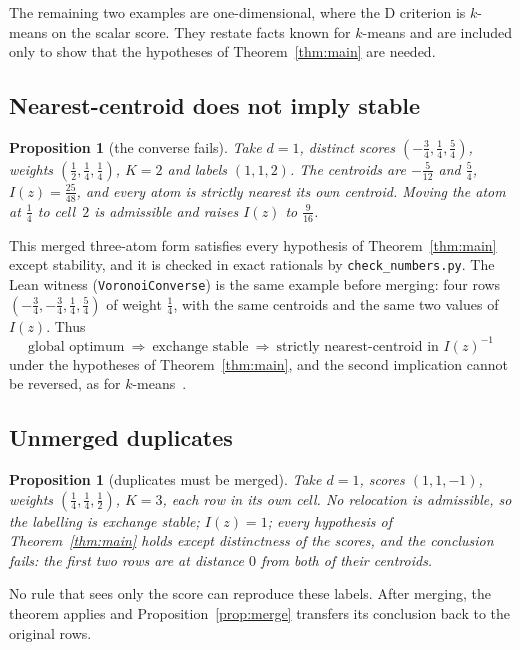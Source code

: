 \documentclass[11pt]{amsart}
\newtheorem{proposition}[theorem]{Proposition}
\theoremstyle{definition}
\theoremstyle{remark}
\newcommand{\Ib}{I(z)}
\begin{document}
The remaining two examples are one-dimensional, where the D criterion is $k$-means on the
scalar score. They restate facts known for $k$-means and are included only to show that the
hypotheses of Theorem~\ref{thm:main} are needed.

\subsection*{Nearest-centroid does not imply stable}

\begin{proposition}[the converse fails]\label{prop:converse}
Take $d=1$, distinct scores $(-\tfrac34,\tfrac14,\tfrac54)$, weights
$(\tfrac12,\tfrac14,\tfrac14)$, $K=2$ and labels $(1,1,2)$. The centroids are $-\tfrac5{12}$ and
$\tfrac54$, $\Ib=\tfrac{25}{48}$, and every atom is strictly nearest its own centroid. Moving the
atom at $\tfrac14$ to cell~$2$ is admissible and raises $\Ib$ to $\tfrac9{16}$.
\end{proposition}

This merged three-atom form satisfies every hypothesis of Theorem~\ref{thm:main} except
stability, and it is checked in exact rationals by \texttt{check\_numbers.py}. The Lean witness
(\texttt{VoronoiConverse}) is the same example before merging: four rows
$(-\tfrac34,-\tfrac34,\tfrac14,\tfrac54)$ of weight $\tfrac14$, with the same centroids and the
same two values of $\Ib$. Thus
\[
\text{global optimum}\ \Rightarrow\ \text{exchange stable}\ \Rightarrow\
\text{strictly nearest-centroid in }\Ib^{-1}
\]
under the hypotheses of Theorem~\ref{thm:main}, and the second implication cannot be reversed, as
for $k$-means~\cite{telgarsky2010}.

\subsection*{Unmerged duplicates}

\begin{proposition}[duplicates must be merged]\label{prop:dup}
Take $d=1$, scores $(1,1,-1)$, weights $(\tfrac14,\tfrac14,\tfrac12)$, $K=3$, each row in its own
cell. No relocation is admissible, so the labelling is exchange stable; $\Ib=1$; every hypothesis
of Theorem~\ref{thm:main} holds except distinctness of the scores, and the conclusion fails: the
first two rows are at distance $0$ from both of their centroids.
\end{proposition}

No rule that sees only the score can reproduce these labels. After merging, the theorem applies
and Proposition~\ref{prop:merge} transfers its conclusion back to the original rows.
\end{document}
